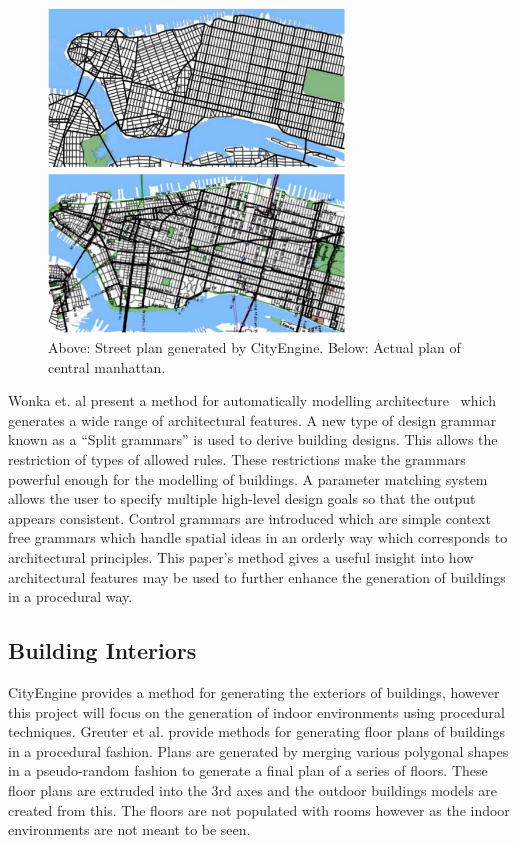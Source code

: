 \begin{figure}
  \centering
    \includegraphics[width=0.7\textwidth]{images/cityengine}
  \caption{Above: Street plan generated by CityEngine. Below: Actual plan of central manhattan.}
\end{figure}


Wonka et. al present a method for automatically modelling architecture~\cite{wonka2003instant} which generates a wide range of architectural features.
A new type of design grammar known as a ``Split grammars'' is used to derive building designs.
This allows the restriction of types of allowed rules. 
These restrictions make the grammars powerful enough for the modelling of buildings.
A parameter matching system allows the user to specify multiple high-level design goals so that the output appears consistent.
Control grammars are introduced which are simple context free grammars which handle spatial ideas in an orderly way which corresponds to architectural principles.
This paper's method gives a useful insight into how architectural features may be used to further enhance the generation of buildings in a procedural way.


\subsection{Building Interiors}
CityEngine provides a method for generating the exteriors of buildings, however this project will focus on the generation of indoor environments using procedural techniques.
Greuter et al. provide methods for generating\cite{greuter2003real} floor plans of buildings in a procedural fashion.
Plans are generated by merging various polygonal shapes in a pseudo-random fashion to generate a final plan of a series of floors.
These floor plans are extruded into the 3rd axes and the outdoor buildings models are created from this.
The floors are not populated with rooms however as the indoor environments are not meant to be seen.

